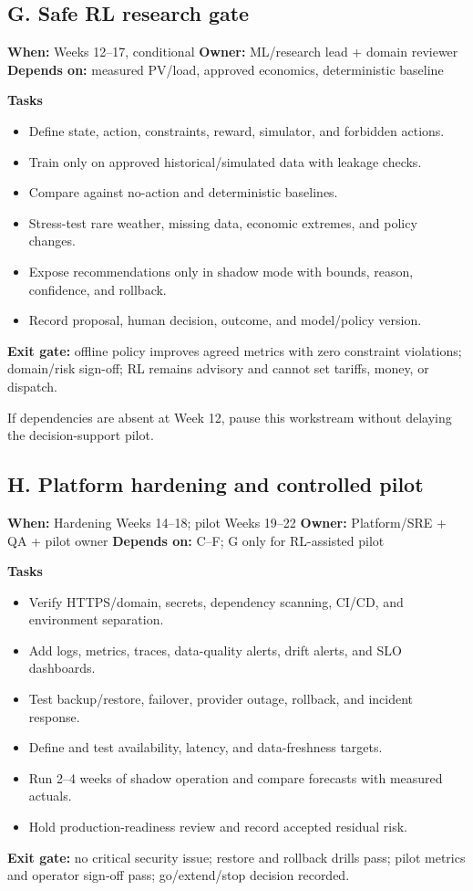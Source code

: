 \documentclass[11pt,a4paper]{article}
\begin{document}
\subsection{G. Safe RL research gate}
\textbf{When:} Weeks 12--17, conditional \quad
\textbf{Owner:} ML/research lead + domain reviewer \quad
\textbf{Depends on:} measured PV/load, approved economics, deterministic baseline

\textbf{Tasks}
\begin{itemize}
  \item Define state, action, constraints, reward, simulator, and forbidden actions.
  \item Train only on approved historical/simulated data with leakage checks.
  \item Compare against no-action and deterministic baselines.
  \item Stress-test rare weather, missing data, economic extremes, and policy changes.
  \item Expose recommendations only in shadow mode with bounds, reason, confidence, and rollback.
  \item Record proposal, human decision, outcome, and model/policy version.
\end{itemize}
\textbf{Exit gate:} offline policy improves agreed metrics with zero constraint violations;
domain/risk sign-off; RL remains advisory and cannot set tariffs, money, or dispatch.

If dependencies are absent at Week 12, pause this workstream without delaying the
decision-support pilot.

\subsection{H. Platform hardening and controlled pilot}
\textbf{When:} Hardening Weeks 14--18; pilot Weeks 19--22 \quad
\textbf{Owner:} Platform/SRE + QA + pilot owner \quad
\textbf{Depends on:} C--F; G only for RL-assisted pilot

\textbf{Tasks}
\begin{itemize}
  \item Verify HTTPS/domain, secrets, dependency scanning, CI/CD, and environment separation.
  \item Add logs, metrics, traces, data-quality alerts, drift alerts, and SLO dashboards.
  \item Test backup/restore, failover, provider outage, rollback, and incident response.
  \item Define and test availability, latency, and data-freshness targets.
  \item Run 2--4 weeks of shadow operation and compare forecasts with measured actuals.
  \item Hold production-readiness review and record accepted residual risk.
\end{itemize}
\textbf{Exit gate:} no critical security issue; restore and rollback drills pass;
pilot metrics and operator sign-off pass; go/extend/stop decision recorded.
\end{document}
